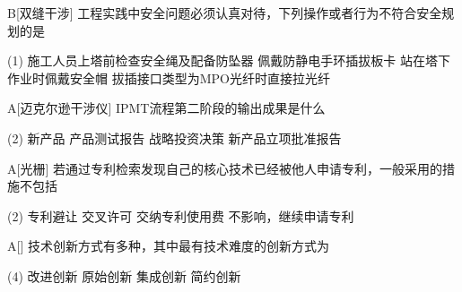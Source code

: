 \begin{choice}{B}[双缝干涉]
    工程实践中安全问题必须认真对待，下列操作或者行为不符合安全规划的是
    \begin{tasks}(1)
        \task 施工人员上塔前检查安全绳及配备防坠器
        \task 佩戴防静电手环插拔板卡
        \task 站在塔下作业时佩戴安全帽
        \task 拔插接口类型为MPO光纤时直接拉光纤
    \end{tasks}
\end{choice}


\begin{choice}{A}[迈克尔逊干涉仪]
    IPMT流程第二阶段的输出成果是什么
    \begin{tasks}(2)
        \task 新产品
        \task 产品测试报告
        \task 战略投资决策
        \task 新产品立项批准报告
    \end{tasks}
\end{choice}


\begin{choice}{A}[光栅]
    若通过专利检索发现自己的核心技术已经被他人申请专利，一般采用的措施不包括
    \begin{tasks}(2)
        \task 专利避让
        \task 交叉许可
        \task 交纳专利使用费
        \task 不影响，继续申请专利
    \end{tasks}
\end{choice}

\begin{choice}{A}[]
    技术创新方式有多种，其中最有技术难度的创新方式为
    \begin{tasks}(4)
        \task 改进创新
        \task 原始创新
        \task 集成创新
        \task 简约创新
    \end{tasks}
\end{choice}


